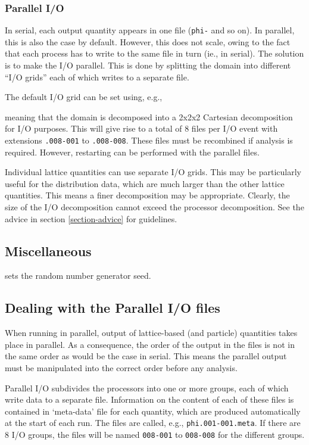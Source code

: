 \subsubsection{Parallel I/O}

In serial, each output quantity appears in one file (\texttt{phi-}
and so on). In parallel, this is also the case by default. However,
this does not scale, owing to the fact that each process has to
write to the same file in turn (ie., in serial). The solution is
to make the I/O parallel. This is done by splitting the domain into
different ``I/O grids'' each of which writes to a separate file.

The default I/O grid can be set using, e.g.,


meaning that the domain is decomposed into a 2x2x2 Cartesian
decomposition for I/O purposes. This will give rise to a total
of 8 files per I/O event with extensions \texttt{.008-001} to
\texttt{.008-008}. These files must be recombined if analysis
is required. However, restarting can be performed with the
parallel files.

Individual lattice quantities can use separate I/O grids. This
may be particularly useful for the distribution data, which are
much larger than the other lattice quantities. This means a
finer decomposition may be appropriate. Clearly, the size of the
I/O decomposition cannot exceed the processor decomposition.
See the advice in section \ref{section-advice} for guidelines.

\subsection{Miscellaneous}


sets the random number generator seed.

\subsection{Dealing with the Parallel I/O files}

When running in parallel, output of lattice-based (and particle)
quantities takes place in parallel. As a consequence, the order
of the output in the files is not in the same order as would be
the case in serial. This means the parallel output must be
manipulated into the correct order before any analysis.

Parallel I/O subdivides the processors into one or more groups,
each of which write data to a separate file. Information on the
content of each of these files is contained in `meta-data' file
for each quantity, which are produced automatically at the start
of each run. The files are called, e.g., \texttt{phi.001-001.meta}.
If there are 8 I/O groups, the files will be named \texttt{008-001}
to \texttt{008-008} for the different groups.

